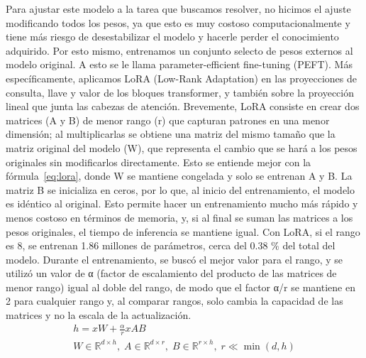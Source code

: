 \documentclass[sigconf,nonacm]{acmart}
\begin{document}
Para ajustar este modelo a la tarea que buscamos resolver, no hicimos el ajuste modificando todos los pesos, ya que esto es muy costoso computacionalmente y tiene más riesgo de desestabilizar el modelo y hacerle perder el conocimiento adquirido. Por esto mismo, entrenamos un conjunto selecto de pesos externos al modelo original. A esto se le llama parameter-efficient fine-tuning (PEFT). Más específicamente, aplicamos LoRA (Low-Rank Adaptation) en las proyecciones de consulta, llave y valor de los bloques transformer, y también sobre la proyección lineal que junta las cabezas de atención. Brevemente, LoRA consiste en crear dos matrices (A y B) de menor rango (r) que capturan patrones en una menor dimensión; al multiplicarlas se obtiene una matriz del mismo tamaño que la matriz original del modelo (W), que representa el cambio que se hará a los pesos originales sin modificarlos directamente. Esto se entiende mejor con la fórmula~\eqref{eq:lora}, donde W se mantiene congelada y solo se entrenan A y B. La matriz B se inicializa en ceros, por lo que, al inicio del entrenamiento, el modelo es idéntico al original. Esto permite hacer un entrenamiento mucho más rápido y menos costoso en términos de memoria, y, si al final se suman las matrices a los pesos originales, el tiempo de inferencia se mantiene igual. Con LoRA, si el rango es 8, se entrenan 1.86 millones de parámetros, cerca del 0.38 \% del total del modelo. Durante el entrenamiento, se buscó el mejor valor para el rango, y se utilizó un valor de α (factor de escalamiento del producto de las matrices de menor rango) igual al doble del rango, de modo que el factor α/r se mantiene en 2 para cualquier rango y, al comparar rangos, solo cambia la capacidad de las matrices y no la escala de la actualización.
\begin{gather}
h = xW + \frac{\alpha}{r}xAB \label{eq:lora}\\
W \in \mathbb{R}^{d \times h},\; A \in \mathbb{R}^{d \times r},\; B \in \mathbb{R}^{r \times h},\; r \ll \min(d,h) \nonumber
\end{gather}
\end{document}
